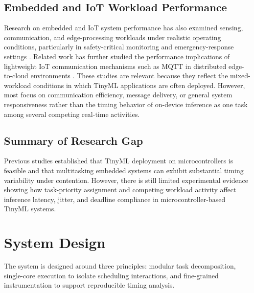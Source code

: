 \documentclass[conference]{IEEEtran}
\begin{document}
\subsection{Embedded and IoT Workload Performance}

Research on embedded and IoT system performance has also examined sensing, communication, and edge-processing workloads under realistic operating conditions, particularly in safety-critical monitoring and emergency-response settings \cite{zhang2025publicsafety,mohsin2024sers}. Related work has further studied the performance implications of lightweight IoT communication mechanisms such as MQTT in distributed edge-to-cloud environments \cite{borsatti2020mqtt,saha2024mqtt}. These studies are relevant because they reflect the mixed-workload conditions in which TinyML applications are often deployed. However, most focus on communication efficiency, message delivery, or general system responsiveness rather than the timing behavior of on-device inference as one task among several competing real-time activities.

\subsection{Summary of Research Gap}

Previous studies established that TinyML deployment on microcontrollers is feasible and that multitasking embedded systems can exhibit substantial timing variability under contention. However, there is still limited experimental evidence showing how task-priority assignment and competing workload activity affect inference latency, jitter, and deadline compliance in microcontroller-based TinyML systems.

\section{System Design}

The system is designed around three principles: modular task decomposition, single-core execution to isolate scheduling interactions, and fine-grained instrumentation to support reproducible timing analysis.
\end{document}
